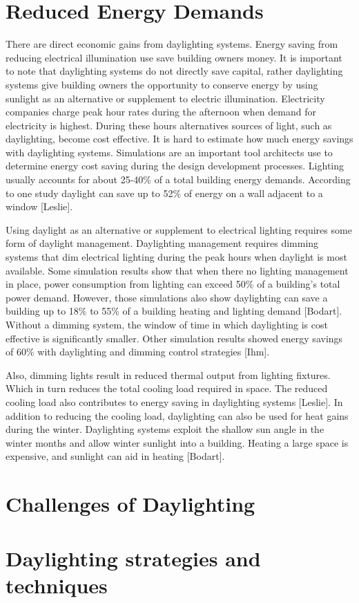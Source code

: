\section{Reduced Energy Demands}
There are direct economic gains from daylighting systems. Energy saving from reducing electrical illumination use save building owners money.
It is important to note that daylighting systems do not directly save capital, rather daylighting systems give building owners the opportunity to conserve energy by using sunlight as an alternative or supplement to electric illumination. Electricity companies charge peak hour rates during the afternoon when demand for electricity is highest. During these hours alternatives sources of light, such as daylighting, become cost effective.
It is hard to estimate how much energy savings with daylighting systems. Simulations are an important tool architects use to determine energy cost saving during the design development processes.  Lighting usually accounts for about 25-40\% of a total building energy demands.
According to one study daylight can save up to 52\% of energy on a wall adjacent to a window [Leslie].

Using daylight as an alternative or supplement to electrical lighting requires some form of daylight management. Daylighting management requires dimming systems that dim electrical lighting during the peak hours when daylight is most available.  Some simulation results show that when there no lighting management in place,  power consumption from lighting can exceed 50\% of a building's total power demand.
However, those simulations also show daylighting can save a building up to 18\% to 55\% of a building heating and lighting demand [Bodart].
Without a dimming system, the window of time in which daylighting is cost effective is significantly smaller. Other simulation results showed energy savings of 60\% with daylighting and dimming control strategies [Ihm].

Also, dimming lights result in reduced thermal output from lighting fixtures. Which in turn reduces the total cooling load required in space. The reduced cooling load also contributes to energy saving in daylighting systems [Leslie].  In addition to reducing the cooling load, daylighting can also be used for heat gains during the winter. Daylighting systems exploit the shallow sun angle in the winter months and allow winter sunlight into a building. Heating a large space is expensive, and sunlight can aid in heating [Bodart].

\section{Challenges of Daylighting}

\section{Daylighting strategies and techniques}

